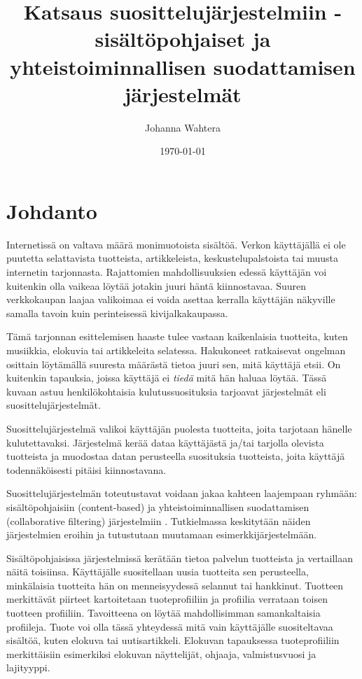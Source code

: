 \documentclass[12pt,finnish]{tktltiki2}
\title{Katsaus suosittelujärjestelmiin - sisältöpohjaiset ja yhteistoiminnallisen suodattamisen järjestelmät}
\author{Johanna Wahtera}
\date{\today}
\theoremstyle{definition}
\theoremstyle{remark}
\begin{document}

\frontmatter      %

\maketitle        %
\makeabstract     %

\tableofcontents  %


\mainmatter       %


\section{Johdanto}
         Internetissä on valtava määrä monimuotoista sisältöä. Verkon käyttäjällä ei ole puutetta selattavista tuotteista, artikkeleista, keskustelupalstoista tai muusta internetin tarjonnasta. Rajattomien mahdollisuuksien edessä käyttäjän voi kuitenkin olla vaikeaa löytää jotakin juuri häntä kiinnostavaa. Suuren verkkokaupan laajaa valikoimaa ei voida asettaa kerralla käyttäjän näkyville samalla tavoin kuin perinteisessä kivijalkakaupassa.
         
Tämä tarjonnan esittelemisen haaste tulee vastaan kaikenlaisia tuotteita, kuten musiikkia, elokuvia tai artikkeleita selatessa. Hakukoneet ratkaisevat ongelman osittain löytämällä suuresta määrästä tietoa juuri sen, mitä käyttäjä etsii. On kuitenkin tapauksia, joissa käyttäjä ei \textit{tiedä} mitä hän haluaa löytää. Tässä kuvaan astuu henkilökohtaisia kulutussuosituksia tarjoavat järjestelmät eli suosittelujärjestelmät.
        
Suosittelujärjestelmä valikoi käyttäjän puolesta tuotteita, joita tarjotaan hänelle kulutettavaksi. Järjestelmä kerää dataa käyttäjästä ja/tai tarjolla olevista tuotteista ja muodostaa datan perusteella suosituksia tuotteista, joita käyttäjä todennäköisesti pitäisi kiinnostavana.

Suosittelujärjestelmän toteutustavat voidaan jakaa kahteen laajempaan ryhmään: sisältöpohjaisiin (content-based) ja yhteistoiminnallisen suodattamisen (collaborative filtering) järjestelmiin \cite{Balabanovic:1997:FCC:245108.245124}\cite{Ullman}.
Tutkielmassa keskitytään näiden järjestelmien eroihin ja tutustutaan muutamaan esimerkkijärjestelmään.

        Sisältöpohjaisissa järjestelmissä kerätään tietoa palvelun tuotteista ja vertaillaan näitä toisiinsa. Käyttäjälle suositellaan uusia tuotteita sen perusteella, minkälaisia tuotteita hän on menneisyydessä selannut tai hankkinut. Tuotteen merkittävät piirteet kartoitetaan tuoteprofiiliin ja profiilia verrataan toisen tuotteen profiiliin. Tavoitteena on löytää mahdollisimman samankaltaisia profiileja. Tuote voi olla tässä yhteydessä mitä vain käyttäjälle suositeltavaa sisältöä, kuten elokuva tai uutisartikkeli. Elokuvan tapauksessa tuoteprofiiliin merkittäisiin esimerkiksi elokuvan näyttelijät, ohjaaja, valmistusvuosi ja lajityyppi. 
        
\end{document}
